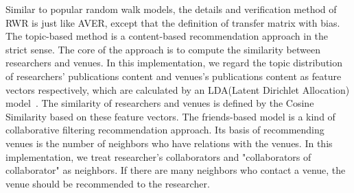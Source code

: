 \documentclass{sig-alternate-2013}
\begin{document}
Similar to popular random walk models, the details and verification method of RWR is just like AVER, except that the definition of transfer matrix with bias. The topic-based method is a content-based recommendation approach in the strict sense. The core of the approach is to compute the similarity between researchers and venues. In this implementation, we regard the topic distribution of researchers' publications content and venues's publications content as feature vectors respectively, which are calculated by an LDA(Latent Dirichlet Allocation) model~\cite{blei2003latent}. The similarity of researchers and venues is defined by the Cosine Similarity based on these feature vectors. The friends-based model is a kind of collaborative filtering recommendation approach. Its basis of recommending venues is the number of neighbors who have relations with the venues. In this implementation, we treat researcher's collaborators and "collaborators of collaborator" as neighbors. If there are many neighbors who contact a venue, the venue should be recommended to the researcher.
\end{document}
